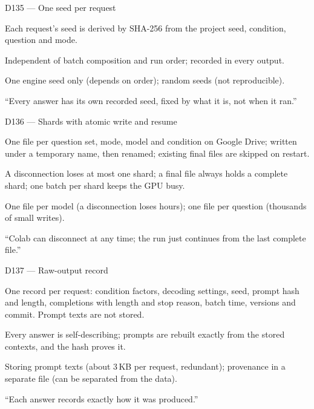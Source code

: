 \documentclass[11pt,a4paper]{report}
\begin{document}
\begin{decisionbox}{D135 --- One seed per request}
\begin{description}[nosep, leftmargin=0pt]
  \item[Decision.] Each request's seed is derived by SHA-256 from the project seed, condition, question and mode.
  \item[Why.] Independent of batch composition and run order; recorded in every output.
  \item[Alternatives.] One engine seed only (depends on order); random seeds (not reproducible).
  \item[Interview line.] ``Every answer has its own recorded seed, fixed by what it is, not when it ran.''
\end{description}
\end{decisionbox}

\begin{decisionbox}{D136 --- Shards with atomic write and resume}
\begin{description}[nosep, leftmargin=0pt]
  \item[Decision.] One file per question set, mode, model and condition on Google Drive; written under a temporary name, then renamed; existing final files are skipped on restart.
  \item[Why.] A disconnection loses at most one shard; a final file always holds a complete shard; one batch per shard keeps the GPU busy.
  \item[Alternatives.] One file per model (a disconnection loses hours); one file per question (thousands of small writes).
  \item[Interview line.] ``Colab can disconnect at any time; the run just continues from the last complete file.''
\end{description}
\end{decisionbox}

\begin{decisionbox}{D137 --- Raw-output record}
\begin{description}[nosep, leftmargin=0pt]
  \item[Decision.] One record per request: condition factors, decoding settings, seed, prompt hash and length, completions with length and stop reason, batch time, versions and commit. Prompt texts are not stored.
  \item[Why.] Every answer is self-describing; prompts are rebuilt exactly from the stored contexts, and the hash proves it.
  \item[Alternatives.] Storing prompt texts (about 3\,KB per request, redundant); provenance in a separate file (can be separated from the data).
  \item[Interview line.] ``Each answer records exactly how it was produced.''
\end{description}
\end{decisionbox}
\end{document}
